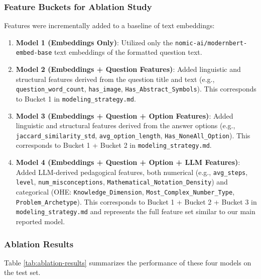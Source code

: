 \documentclass[
    a4paper, %
    10pt, %
    twoside, %
]{LTJournalArticle}
\begin{document}
\subsubsection{Feature Buckets for Ablation Study}
Features were incrementally added to a baseline of text embeddings:
\begin{enumerate}
    \item \textbf{Model 1 (Embeddings Only)}: Utilized only the \texttt{nomic-ai/modernbert-embed-base} text embeddings of the formatted question text.
    \item \textbf{Model 2 (Embeddings + Question Features)}: Added linguistic and structural features derived from the question title and text (e.g., \texttt{question\_word\_count}, \texttt{has\_image}, \texttt{Has\_Abstract\_Symbols}). This corresponds to Bucket 1 in \texttt{modeling\_strategy.md}.
    \item \textbf{Model 3 (Embeddings + Question + Option Features)}: Added linguistic and structural features derived from the answer options (e.g., \texttt{jaccard\_similarity\_std}, \texttt{avg\_option\_length}, \texttt{Has\_NoneAll\_Option}). This corresponds to Bucket 1 + Bucket 2 in \texttt{modeling\_strategy.md}.
    \item \textbf{Model 4 (Embeddings + Question + Option + LLM Features)}: Added LLM-derived pedagogical features, both numerical (e.g., \texttt{avg\_steps}, \texttt{level}, \texttt{num\_misconceptions}, \texttt{Mathematical\_Notation\_Density}) and categorical (OHE: \texttt{Knowledge\_Dimension}, \texttt{Most\_Complex\_Number\_Type}, \texttt{Problem\_Archetype}). This corresponds to Bucket 1 + Bucket 2 + Bucket 3 in \texttt{modeling\_strategy.md} and represents the full feature set similar to our main reported model.
\end{enumerate}

\subsubsection{Ablation Results}
Table \ref{tab:ablation-results} summarizes the performance of these four models on the test set.
\end{document}
